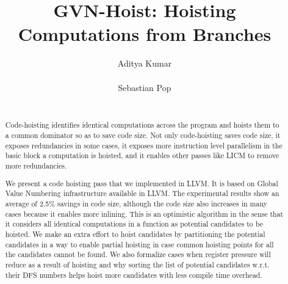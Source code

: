 \documentclass{sig-alternate}
\begin{document}
\def \GCC {GCC}
\def \LLVM {LLVM}
\def \SESE {SESE}
\def \CFG {CFG}
\def \SSA {SSA}
\def \MemorySSA {MemorySSA}
\def \PRE {PRE}
\def \GVN {GVN}
\def \LLVMTestSuite {\LLVM{} test-suite}

\setlength{\pdfpageheight}{\paperheight}
\setlength{\pdfpagewidth}{\paperwidth}

\title{\GVN{}-Hoist: Hoisting Computations from Branches}

\toappear{
   \hrule \vspace{5pt}
   \LLVM{}-dev 2016
}

\author{
\alignauthor
Aditya Kumar\\
       \\
\alignauthor
Sebastian Pop\\
       \\
}

\maketitle
\begin{abstract}
  Code-hoisting identifies identical computations across the program and hoists
  them to a common dominator so as to save code size.  Not only code-hoisting
  saves code size, it exposes redundancies in some cases, it exposes more
  instruction level parallelism in the basic block a computation is hoisted, and
  it enables other passes like LICM to remove more redundancies.

  We present a code hoisting pass that we implemented in \LLVM{}. It is based on
  Global Value Numbering infrastructure available in \LLVM{}. The experimental
  results show an average of 2.5\% savings in code size, although the code size
  also increases in many cases because it enables more inlining. This is an
  optimistic algorithm in the sense that it considers all identical computations
  in a function as potential candidates to be hoisted. We make an extra effort
  to hoist candidates by partitioning the potential candidates in a way to
  enable partial hoisting in case common hoisting points for all the candidates
  cannot be found. We also formalize cases when register pressure will reduce as
  a result of hoisting and why sorting the list of potential candidates
  w.r.t. their DFS numbers helps hoist more candidates with less compile time
  overhead.
\end{abstract}
\end{document}
